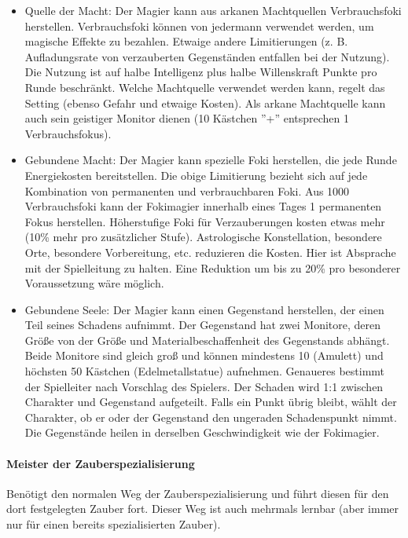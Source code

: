 \documentclass{article}
\begin{document}
\begin{itemize}
\item Quelle der Macht: Der Magier kann aus arkanen Machtquellen Verbrauchsfoki herstellen. Verbrauchsfoki können von jedermann verwendet werden, um magische Effekte zu bezahlen. Etwaige andere Limitierungen (z. B. Aufladungsrate von verzauberten Gegenständen entfallen bei der Nutzung). Die Nutzung ist auf halbe Intelligenz plus halbe Willenskraft Punkte pro Runde beschränkt. Welche Machtquelle verwendet werden kann, regelt das Setting (ebenso Gefahr und etwaige Kosten). Als arkane Machtquelle kann auch sein geistiger Monitor dienen (10 Kästchen ''+'' entsprechen 1 Verbrauchsfokus).
\item Gebundene Macht: Der Magier kann spezielle Foki herstellen, die jede Runde Energiekosten bereitstellen. Die obige Limitierung bezieht sich auf jede Kombination von permanenten und verbrauchbaren Foki. Aus 1000 Verbrauchsfoki kann der Fokimagier innerhalb eines Tages 1 permanenten Fokus herstellen. Höherstufige Foki für Verzauberungen kosten etwas mehr (10\% mehr pro zusätzlicher Stufe). Astrologische Konstellation, besondere Orte, besondere Vorbereitung, etc. reduzieren die Kosten. Hier ist Absprache mit der Spielleitung zu halten. Eine Reduktion um bis zu 20\% pro besonderer Voraussetzung wäre möglich.
\item Gebundene Seele: Der Magier kann einen Gegenstand herstellen, der einen Teil seines Schadens aufnimmt. Der Gegenstand hat zwei Monitore, deren Größe von der Größe und Materialbeschaffenheit des Gegenstands abhängt. Beide Monitore sind gleich groß und können mindestens 10 (Amulett) und höchsten 50 Kästchen (Edelmetallstatue) aufnehmen. Genaueres bestimmt der Spielleiter nach Vorschlag des Spielers. Der Schaden wird 1:1 zwischen Charakter und Gegenstand aufgeteilt. Falls ein Punkt übrig bleibt, wählt der Charakter, ob er oder der Gegenstand den ungeraden Schadenspunkt nimmt. Die Gegenstände heilen in derselben Geschwindigkeit wie der Fokimagier.
\end{itemize}

\paragraph{Meister der Zauberspezialisierung}

Benötigt den normalen Weg der Zauberspezialisierung und führt diesen für den dort festgelegten Zauber fort. Dieser Weg
ist auch mehrmals lernbar (aber immer nur für einen bereits spezialisierten Zauber).
\end{document}
